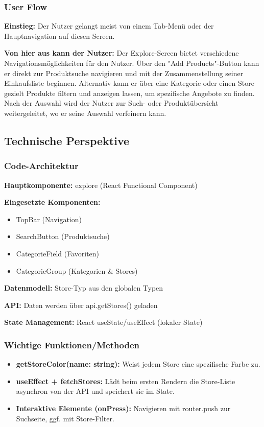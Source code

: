 \documentclass[12pt, a4paper]{report} %
\begin{document}
\subsubsection{User Flow}

\textbf{Einstieg:} Der Nutzer gelangt meist von einem Tab-Menü oder der Hauptnavigation auf diesen Screen.

\noindent\textbf{Von hier aus kann der Nutzer:}
Der Explore-Screen bietet verschiedene Navigationsmöglichkeiten für den Nutzer. Über den "Add Products"-Button kann er direkt zur Produktsuche navigieren und mit der Zusammenstellung seiner Einkaufsliste beginnen. Alternativ kann er über eine Kategorie oder einen Store gezielt Produkte filtern und anzeigen lassen, um spezifische Angebote zu finden. Nach der Auswahl wird der Nutzer zur Such- oder Produktübersicht weitergeleitet, wo er seine Auswahl verfeinern kann.

\subsection{Technische Perspektive}

\subsubsection{Code-Architektur}

\textbf{Hauptkomponente:} explore (React Functional Component)

\noindent\textbf{Eingesetzte Komponenten:}
\begin{itemize}
    \item TopBar (Navigation)
    \item SearchButton (Produktsuche)
    \item CategorieField (Favoriten)
    \item CategorieGroup (Kategorien \& Stores)
\end{itemize}

\noindent\textbf{Datenmodell:} Store-Typ aus den globalen Typen

\noindent\textbf{API:} Daten werden über api.getStores() geladen

\noindent\textbf{State Management:} React useState/useEffect (lokaler State)

\subsubsection{Wichtige Funktionen/Methoden}

\begin{itemize}
    \item \textbf{getStoreColor(name: string):} Weist jedem Store eine spezifische Farbe zu.
    \item \textbf{useEffect + fetchStores:} Lädt beim ersten Rendern die Store-Liste asynchron von der API und speichert sie im State.
    \item \textbf{Interaktive Elemente (onPress):} Navigieren mit router.push zur Suchseite, ggf. mit Store-Filter.
\end{itemize}
\end{document}
